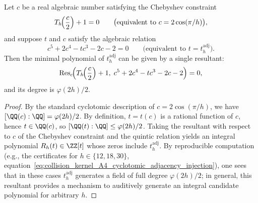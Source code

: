 \begin{proposition}\label{prop:pom-a4t-cyclotomic-adj-minpoly-resultant}
Let \(c\) be a real algebraic number satisfying the Chebyshev constraint
\[
T_h\!\Bigl(\frac{c}{2}\Bigr)+1=0
\qquad\bigl(\text{equivalent to }c=2\cos(\pi/h)\bigr),
\]
and suppose \(t\) and \(c\) satisfy the algebraic relation
\[
c^5+2c^4-tc^3-2c-2=0
\qquad\bigl(\text{equivalent to }t=t_h^{\mathrm{adj}}\bigr).
\]
Then the minimal polynomial of \(t_h^{\mathrm{adj}}\) can be given by a single resultant:
\[
\mathrm{Res}_c\!\Bigl(T_h\!\Bigl(\frac{c}{2}\Bigr)+1,\;c^5+2c^4-tc^3-2c-2\Bigr)=0,
\]
and its degree is \(\varphi(2h)/2\).
\end{proposition}
\begin{proof}
By the standard cyclotomic description of \(c=2\cos(\pi/h)\), we have \([\QQ(c):\QQ]=\varphi(2h)/2\).
By definition, \(t=t(c)\) is a rational function of \(c\), hence \(t\in\QQ(c)\), so \([\QQ(t):\QQ]\le \varphi(2h)/2\).
Taking the resultant with respect to \(c\) of the Chebyshev constraint and the quintic relation yields an integral polynomial \(R_h(t)\in\ZZ[t]\) whose zeros include \(t_h^{\mathrm{adj}}\).
By reproducible computation (e.g., the certificates for \(h\in\{12,18,30\}\), equation~\eqref{eq:collision_kernel_A4_cyclotomic_adjacency_injection}), one sees that in these cases \(t_h^{\mathrm{adj}}\) generates a field of full degree \(\varphi(2h)/2\);
in general, this resultant provides a mechanism to auditively generate an integral candidate polynomial for arbitrary \(h\).
\end{proof}






